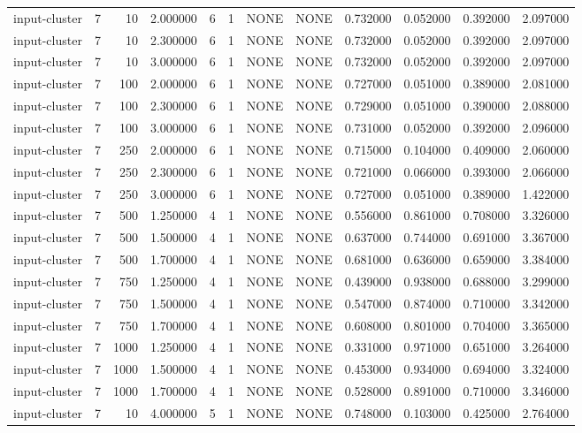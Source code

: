 \begin{tabular}{lrrrllllrrrr}
input-cluster & 7 & 10 & 2.000000 & 6 & 1 & NONE & NONE & 0.732000 & 0.052000 & 0.392000 & 2.097000 \\
input-cluster & 7 & 10 & 2.300000 & 6 & 1 & NONE & NONE & 0.732000 & 0.052000 & 0.392000 & 2.097000 \\
input-cluster & 7 & 10 & 3.000000 & 6 & 1 & NONE & NONE & 0.732000 & 0.052000 & 0.392000 & 2.097000 \\
input-cluster & 7 & 100 & 2.000000 & 6 & 1 & NONE & NONE & 0.727000 & 0.051000 & 0.389000 & 2.081000 \\
input-cluster & 7 & 100 & 2.300000 & 6 & 1 & NONE & NONE & 0.729000 & 0.051000 & 0.390000 & 2.088000 \\
input-cluster & 7 & 100 & 3.000000 & 6 & 1 & NONE & NONE & 0.731000 & 0.052000 & 0.392000 & 2.096000 \\
input-cluster & 7 & 250 & 2.000000 & 6 & 1 & NONE & NONE & 0.715000 & 0.104000 & 0.409000 & 2.060000 \\
input-cluster & 7 & 250 & 2.300000 & 6 & 1 & NONE & NONE & 0.721000 & 0.066000 & 0.393000 & 2.066000 \\
input-cluster & 7 & 250 & 3.000000 & 6 & 1 & NONE & NONE & 0.727000 & 0.051000 & 0.389000 & 1.422000 \\
input-cluster & 7 & 500 & 1.250000 & 4 & 1 & NONE & NONE & 0.556000 & 0.861000 & 0.708000 & 3.326000 \\
input-cluster & 7 & 500 & 1.500000 & 4 & 1 & NONE & NONE & 0.637000 & 0.744000 & 0.691000 & 3.367000 \\
input-cluster & 7 & 500 & 1.700000 & 4 & 1 & NONE & NONE & 0.681000 & 0.636000 & 0.659000 & 3.384000 \\
input-cluster & 7 & 750 & 1.250000 & 4 & 1 & NONE & NONE & 0.439000 & 0.938000 & 0.688000 & 3.299000 \\
input-cluster & 7 & 750 & 1.500000 & 4 & 1 & NONE & NONE & 0.547000 & 0.874000 & 0.710000 & 3.342000 \\
input-cluster & 7 & 750 & 1.700000 & 4 & 1 & NONE & NONE & 0.608000 & 0.801000 & 0.704000 & 3.365000 \\
input-cluster & 7 & 1000 & 1.250000 & 4 & 1 & NONE & NONE & 0.331000 & 0.971000 & 0.651000 & 3.264000 \\
input-cluster & 7 & 1000 & 1.500000 & 4 & 1 & NONE & NONE & 0.453000 & 0.934000 & 0.694000 & 3.324000 \\
input-cluster & 7 & 1000 & 1.700000 & 4 & 1 & NONE & NONE & 0.528000 & 0.891000 & 0.710000 & 3.346000 \\
input-cluster & 7 & 10 & 4.000000 & 5 & 1 & NONE & NONE & 0.748000 & 0.103000 & 0.425000 & 2.764000 \\

\end{tabular}
